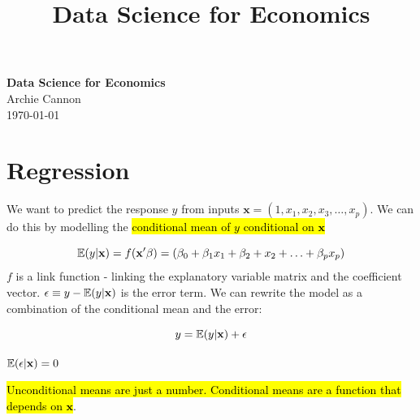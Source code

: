 \documentclass[11pt]{article}
\begin{document}
\title{Data Science for Economics}

\thispagestyle{empty}

\begin{center}
{\LARGE \bf Data Science for Economics}\\
{\large Archie Cannon}\\
\today
\end{center}

{
\begin{tcolorbox}[title=Contents, fonttitle=\huge\sffamily\bfseries\selectfont,interior style={left color=contcol1!50!white,right color=contcol2!50!white},frame style={left color=contcol1!80!white,right color=contcol2!80!white},coltitle=black,top=2mm,bottom=2mm,left=2mm,right=2mm,drop fuzzy shadow,enhanced,breakable]
\makeatletter
{}
\makeatother
\end{tcolorbox}}

\newpage

\section{Regression}

We want to predict the response $y$ from inputs $\mathbf{x} = (1, x_1, x_2, x_3, \ldots, x_p)$. We can do this by modelling the \hl{conditional mean of $y$ conditional on $\mathbf{x}$}

\begin{equation*}
    \mathbb{E}(y|\mathbf{x}) = f(\mathbf{x^\prime\beta}) = (\beta_0 + \beta_1 x_1 + \beta_2 + x_2 + \ldots + \beta_p x_p)
\end{equation*}
$f$ is a link function - linking the explanatory variable matrix and the coefficient vector. $\epsilon \equiv y - \mathbb{E}(y|\mathbf{x})$ is the error term. We can rewrite the model as a combination of the conditional mean and the error:

\begin{equation}
    y = \mathbb{E}(y|\mathbf{x}) + \epsilon
\end{equation}

\begin{note}
    $\mathbb{E}(\epsilon|\mathbf{x}) = 0$
\end{note}

\begin{note}
    \hl{Unconditional means are just a number. Conditional means are a function that depends on $\mathbf{x}$}.
\end{note}
\end{document}
